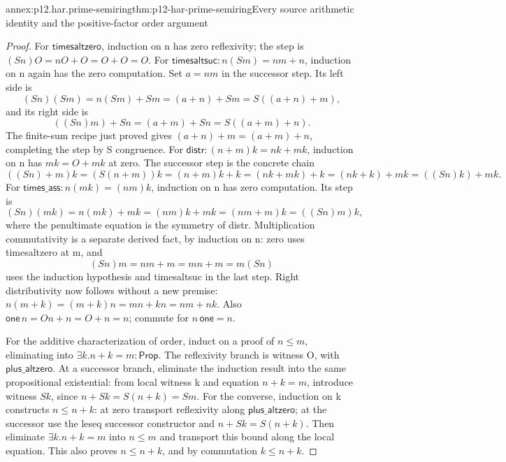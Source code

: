 \begin{annexitem}{annex:p12.har.prime-semiring}{thm:p12-har-prime-semiring}{Every source arithmetic identity and the positive-factor order argument}
\begin{proof}
For \(\mathsf{timesaltzero}\), induction on n has zero reflexivity;
the step is \((S n)O=nO+O=O+O=O\).
For \(\mathsf{timesaltsuc}:n(S m)=nm+n\), induction on n again
has the zero computation. Set \(a=nm\) in the successor step.
Its left side is
\[
 (S n)(S m)=n(S m)+S m=(a+n)+S m=S((a+n)+m),
\]
and its right side is
\[
 ((S n)m)+S n=(a+m)+S n=S((a+m)+n).
\]
The finite-sum recipe just proved gives
\((a+n)+m=(a+m)+n\), completing the step by S congruence.
For \(\mathsf{distr}:(n+m)k=nk+mk\), induction on n has
\(mk=O+mk\) at zero. The successor step is the concrete chain
\[
 ((S n)+m)k=(S(n+m))k=(n+m)k+k
       =(nk+mk)+k=(nk+k)+mk=((S n)k)+mk.
\]
For \(\mathsf{times\_ass}:n(mk)=(nm)k\), induction on n has
zero computation. Its step is
\[
 (S n)(mk)=n(mk)+mk=(nm)k+mk=(nm+m)k=((S n)m)k,
\]
where the penultimate equation is the symmetry of distr.
Multiplication commutativity is a separate derived fact, by induction
on n: zero uses timesaltzero at m, and
\[
 (S n)m=nm+m=mn+m=m(S n)
\]
uses the induction hypothesis and timesaltsuc in the last step.
Right distributivity now follows without a new premise:
\(n(m+k)=(m+k)n=mn+kn=nm+nk\).
Also \(\mathsf{one}\,n=On+n=O+n=n\); commute for
\(n\,\mathsf{one}=n\).

For the additive characterization of order, induct on a proof of
\(n\le m\), eliminating into \(\exists k.n+k=m:\mathsf{Prop}\).
The reflexivity branch is witness O, with \(\mathsf{plus\_altzero}\).
At a successor branch, eliminate the induction result into the same
propositional existential: from local witness k and equation
\(n+k=m\), introduce witness \(S k\), since
\(n+S k=S(n+k)=S m\).
For the converse, induction on k constructs \(n\le n+k\): at
zero transport reflexivity along \(\mathsf{plus\_altzero}\); at the successor use
the leseq successor constructor and \(n+S k=S(n+k)\).
Then eliminate \(\exists k.n+k=m\) into \(n\le m\) and transport
this bound along the local equation. This also proves
\(n\le n+k\), and by commutation \(k\le n+k\).


\end{proof}
\end{annexitem}

